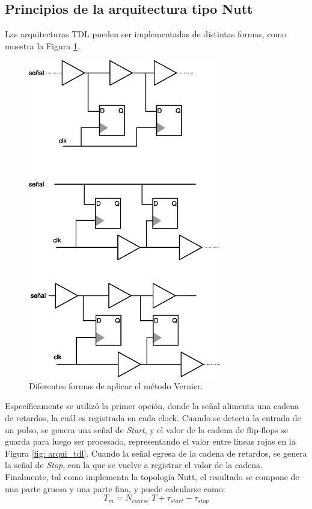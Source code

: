 \subsection{Principios de la arquitectura tipo Nutt}
Las arquitecturas TDL pueden ser implementadas de distintas formas, como muestra la Figura \ref{fig: various_tdl}.
\begin{figure}[H]
     \centering
     \includegraphics[width=0.75\textwidth]{imagenes/various_tdl.eps}
     \caption{Diferentes formas de aplicar el método Vernier.}
     \label{fig: various_tdl}
\end{figure}

Específicamente se utilizó la primer opción, donde la señal alimenta una cadena de retardos, la cuál es registrada en cada clock. 
Cuando se detecta la entrada de un pulso, se genera una señal de \textit{Start}, y el valor de la cadena de flip-flops se guarda para luego ser procesado,
representando el valor entre lineas rojas en la Figura \ref{fig: arqui_tdl}.
Cuando la señal egresa de la cadena de retardos, se genera la señal de \textit{Stop}, con la que se vuelve a registrar el valor de la cadena. 
Finalmente, tal como implementa la topología Nutt, el resultado se compone de una parte gruesa y una parte fina, y puede calcularse como:
\begin{equation*}
     T_{m} = N_{coarse} \; T + \tau_{start} - \tau_{stop}
\end{equation*}

